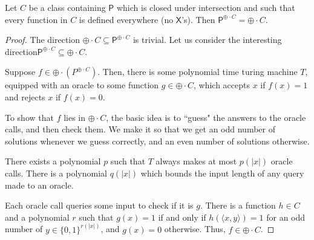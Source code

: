 \documentclass[11pt]{article}
\newcommand{\parity}{\oplus}
\newcommand{\p}{\textsf{P}}
\newcommand{\x}{\textsf{X}}
\begin{document}
\begin{theorem}\label{oracleparityc}
Let $C$ be a class containing \emph{$\p$} which is closed under intersection and such that every function in $C$ is defined everywhere (no \emph{$\x$}'s). Then \emph{$ \p^{\parity \cdot C} = \parity \cdot C$}.
\end{theorem}
\begin{proof}
The direction $\parity \cdot C \subseteq \p^{\parity \cdot C}$ is trivial. Let us consider the interesting direction\linebreak $\p^{\parity \cdot C}\subseteq \parity\cdot C$.

Suppose $f \in \parity \cdot (P^{\parity\cdot C})$. Then, there is some polynomial time turing machine $T$, equipped with an oracle to some function $g\in \parity\cdot C$, which accepts $x$ if $f(x) = 1$ and rejects $x$ if $f(x) = 0$.

To show that $f$ lies in $\parity\cdot C$, the basic idea is to ``guess" the answers to the oracle calls, and then check them. We make it so that we get an odd number of solutions whenever we guess correctly, and an even number of solutions otherwise.

There exists a polynomial $p$ such that $T$ always makes at most $p(|x|)$ oracle calls. There is a polynomial $q(|x|)$ which bounds the input length of any query made to an oracle.

Each oracle call queries some input to check if it is $g$. There is a function $h \in C$ and a polynomial $r$ such that $g(x) = 1$ if and only if $h(\langle x,y\rangle) = 1$ for an odd number of $y\in\{0,1\}^{r(|x|)}$, and $g(x) = 0$ otherwise. Thus, $f \in \parity \cdot C$.


\end{proof}
\end{document}
